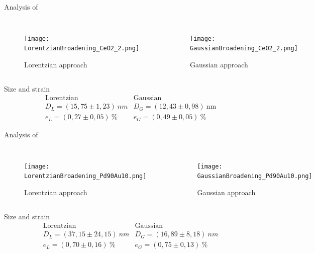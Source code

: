 \documentclass{beamer}
\begin{document}
\begin{frame}{Analysis of }
\vspace{-0.45cm}
    \begin{columns}
        \begin{figure}
            \centering
            \texttt{[image: LorentzianBroadening\_CeO2\_2.png]}
            \caption{Lorentzian approach}
        \end{figure}
        \begin{figure}
            \centering
            \texttt{[image: GaussianBroadening\_CeO2\_2.png]}
            \caption{Gaussian approach}
        \end{figure}
    \end{columns}
    \vspace{-0.5cm}
    \begin{block}{Size and strain}
    \[
        \begin{array}{ll}
            \text{Lorentzian} & \text{Gaussian} \\
             D_L = (15,75 \pm 1,23) \ \si{nm} & D_G = (12,43 \pm 0,98) \ \text{nm} \\
             e_L = (0,27 \pm 0,05) \ \% & e_G = (0,49 \pm 0,05) \ \%
        \end{array}
    \]
    \end{block}
\end{frame}

\begin{frame}{Analysis of }
\vspace{-0.45cm}
    \begin{columns}
        \begin{figure}
            \centering
            \texttt{[image: LorentzianBroadening\_Pd90Au10.png]}
            \caption{Lorentzian approach}
        \end{figure}
        \begin{figure}
            \centering
            \texttt{[image: GaussianBroadening\_Pd90Au10.png]}
            \caption{Gaussian approach}
        \end{figure}
    \end{columns}
    \vspace{-0.5cm}
    \begin{block}{Size and strain}
    \[
        \begin{array}{ll}
            \text{Lorentzian} & \text{Gaussian} \\
             D_L = (37,15 \pm 24,15) \ \si{nm} & D_G = (16,89 \pm 8,18)\ \si{nm} \\
             e_L = (0,70 \pm 0,16) \ \% & e_G = (0,75 \pm 0,13) \ \%
        \end{array}
    \]
    \end{block}
\end{frame}
\end{document}
